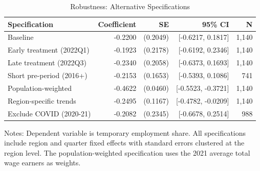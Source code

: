 \begin{table}[H]
\centering
\caption{Robustness: Alternative Specifications}
\begin{threeparttable}
\begin{tabular}{lrrrr}
\toprule
Specification & Coefficient & SE & 95\% CI & N \\
\midrule
Baseline & -0.2200 & (0.2049) & [-0.6217, 0.1817] & 1,140 \\
Early treatment (2022Q1) & -0.1923 & (0.2178) & [-0.6192, 0.2346] & 1,140 \\
Late treatment (2022Q3) & -0.2340 & (0.2058) & [-0.6373, 0.1693] & 1,140 \\
Short pre-period (2016+) & -0.2153 & (0.1653) & [-0.5393, 0.1086] & 741 \\
Population-weighted & -0.4622 & (0.0460) & [-0.5523, -0.3721] & 1,140 \\
Region-specific trends & -0.2495 & (0.1167) & [-0.4782, -0.0209] & 1,140 \\
Exclude COVID (2020-21) & -0.2082 & (0.2345) & [-0.6678, 0.2514] & 988 \\
\bottomrule
\end{tabular}
\begin{tablenotes}[flushleft]
\small
\item Notes: Dependent variable is temporary employment share. All specifications include region and quarter fixed effects with standard errors clustered at the region level. The population-weighted specification uses the 2021 average total wage earners as weights.
\end{tablenotes}
\end{threeparttable}
\label{tab:robust}
\end{table}

